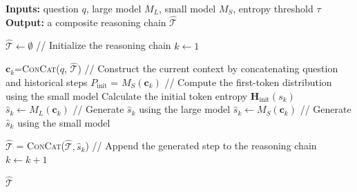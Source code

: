 \begin{algorithm}[tbh]
\small
\caption{Step-wise Collaborative Inference via \approach}
\label{alg:ite_router}
\begin{algorithmic}[1]
\State \textbf{Inputs:} question $q$, large model $M_L$, small model $M_S$, entropy threshold $\tau$
\State \textbf{Output:} a composite reasoning chain $\hat{\mathcal{T}}$

\State $\hat{\mathcal{T}} \leftarrow \emptyset$ // Initialize the reasoning chain 
\State $k \leftarrow 1$

    \State  $\mathbf{c}_k$=\textsc{ConCat}($q$, $\hat{\mathcal{T}}$) // Construct the current context by concatenating question and historical steps 
    \State $P_{\text{init}}$ = $M_S(\mathbf{c}_k)$ // Compute the first-token distribution using the small model 
    \State Calculate the initial token entropy $\mathbf{H}_\text{init}(s_k)$ 
        \State $\hat{s}_k \leftarrow M_L(\mathbf{c}_k)$ // Generate $\hat{s}_k$ using the large model
    \Else
        \State $\hat{s}_k \leftarrow M_S(\mathbf{c}_k)$ // Generate $\hat{s}_k$ using the small model
    \EndIf
    
    \State $\hat{\mathcal{T}}$ = \textsc{ConCat}($\hat{\mathcal{T}}, \hat{s}_k$) // Append the generated step to the reasoning chain
    \State $k \leftarrow k + 1$
\EndWhile

\State \Return $\hat{\mathcal{T}}$
\end{algorithmic}
\end{algorithm}
